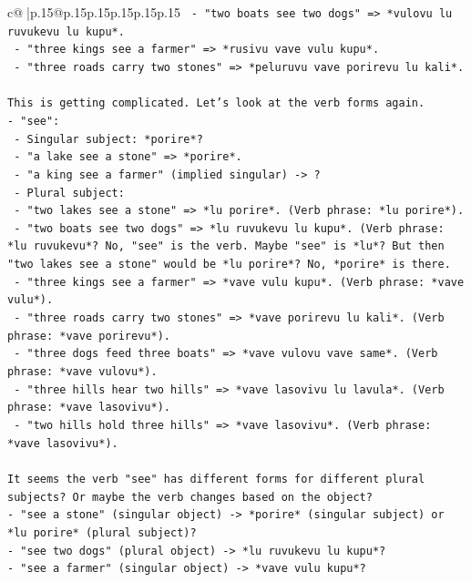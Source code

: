 \documentclass{article}
\begin{document}
{\begin{supertabular}{c@{$\;$}|p{.15\linewidth}@{}p{.15\linewidth}p{.15\linewidth}p{.15\linewidth}p{.15\linewidth}p{.15\linewidth}}
{{{\texttt{   {-} "two boats see two dogs" => *vulovu lu ruvukevu lu kupu*.} \\
\texttt{   {-} "three kings see a farmer" => *rusivu vave vulu kupu*.} \\
\texttt{   {-} "three roads carry two stones" => *peluruvu vave porirevu lu kali*.} \\
\\ 
\texttt{This is getting complicated. Let's look at the verb forms again.} \\
\texttt{{-} "see":} \\
\texttt{  {-} Singular subject: *porire*?} \\
\texttt{    {-} "a lake see a stone" => *porire*.} \\
\texttt{    {-} "a king see a farmer" (implied singular) {-}> ?} \\
\texttt{  {-} Plural subject:} \\
\texttt{    {-} "two lakes see a stone" => *lu porire*. (Verb phrase: *lu porire*).} \\
\texttt{    {-} "two boats see two dogs" => *lu ruvukevu lu kupu*. (Verb phrase: *lu ruvukevu*? No, "see" is the verb. Maybe "see" is *lu*? But then "two lakes see a stone" would be *lu porire*? No, *porire* is there.} \\
\texttt{    {-} "three kings see a farmer" => *vave vulu kupu*. (Verb phrase: *vave vulu*).} \\
\texttt{    {-} "three roads carry two stones" => *vave porirevu lu kali*. (Verb phrase: *vave porirevu*).} \\
\texttt{    {-} "three dogs feed three boats" => *vave vulovu vave same*. (Verb phrase: *vave vulovu*).} \\
\texttt{    {-} "three hills hear two hills" => *vave lasovivu lu lavula*. (Verb phrase: *vave lasovivu*).} \\
\texttt{    {-} "two hills hold three hills" => *vave lasovivu*. (Verb phrase: *vave lasovivu*).} \\
\\ 
\texttt{It seems the verb "see" has different forms for different plural subjects? Or maybe the verb changes based on the object?} \\
\texttt{{-} "see a stone" (singular object) {-}> *porire* (singular subject) or *lu porire* (plural subject)?} \\
\texttt{{-} "see two dogs" (plural object) {-}> *lu ruvukevu lu kupu*?} \\
\texttt{{-} "see a farmer" (singular object) {-}> *vave vulu kupu*?} \\
}}}
\end{supertabular}}
\end{document}

